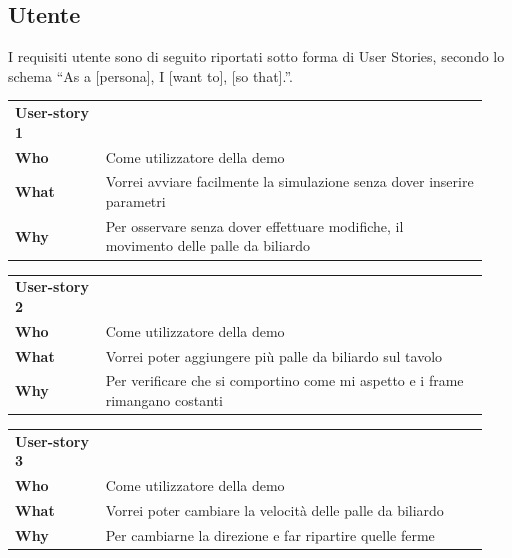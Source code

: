 \subsection{Utente}\label{subsec:demo-utente}
I requisiti utente sono di seguito riportati sotto forma di User Stories, secondo lo schema
“As a [persona], I [want to], [so that].”.
\begin{table}[H]
    \begin{tabular}{p{0.18\linewidth}p{0.76\linewidth}}
        \toprule
        \textbf{User-story 1} &                                                                                      \\
        \textbf{Who}          & Come utilizzatore della demo                                                         \\
        \textbf{What}         & Vorrei avviare facilmente la simulazione senza dover inserire parametri              \\
        \textbf{Why}          & Per osservare senza dover effettuare modifiche, il movimento delle palle da biliardo \\
        \bottomrule
    \end{tabular}\label{tab:user-story-1}
\end{table}
\begin{table}[H]
    \begin{tabular}{p{0.18\linewidth}p{0.76\linewidth}}
        \toprule
        \textbf{User-story 2} &                                                                               \\
        \textbf{Who}          & Come utilizzatore della demo                                                  \\
        \textbf{What}         & Vorrei poter aggiungere più palle da biliardo sul tavolo                      \\
        \textbf{Why}          & Per verificare che si comportino come mi aspetto e i frame rimangano costanti \\
        \bottomrule
    \end{tabular}\label{tab:user-story-2}
\end{table}
\begin{table}[H]
    \begin{tabular}{p{0.18\linewidth}p{0.76\linewidth}}
        \toprule
        \textbf{User-story 3} &                                                           \\
        \textbf{Who}          & Come utilizzatore della demo                              \\
        \textbf{What}         & Vorrei poter cambiare la velocità delle palle da biliardo \\
        \textbf{Why}          & Per cambiarne la direzione e far ripartire quelle ferme   \\
        \bottomrule
    \end{tabular}\label{tab:user-story-3}
\end{table}
